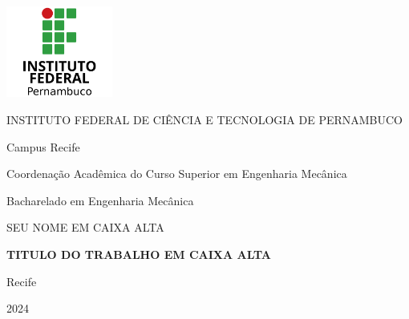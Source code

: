 \begin{center}
	
\includegraphics[width=3.5cm,height=3cm]{00_CONF/00_logo.png}

\vspace{1ex}

INSTITUTO FEDERAL DE CIÊNCIA E TECNOLOGIA DE PERNAMBUCO

Campus Recife

Coordenação Acadêmica do Curso Superior em Engenharia Mecânica

Bacharelado em Engenharia Mecânica

\vspace{3cm}

SEU NOME EM CAIXA ALTA

\vspace{3cm}

\textbf{TITULO DO TRABALHO EM CAIXA ALTA}

\vfill{}

Recife

2024


\thispagestyle{empty}
\end{center}